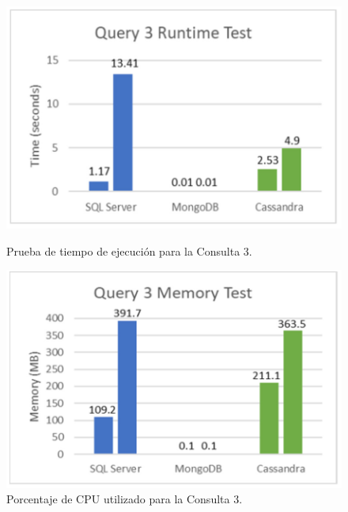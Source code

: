 \documentclass[pdflatex,sn-mathphys-num]{sn-jnl}
\theoremstyle{thmstyleone}%
\theoremstyle{thmstyletwo}%
\theoremstyle{thmstylethree}%
\begin{document}
\begin{figure}[H]
    \centering
    \begin{minipage}[b]{0.48\textwidth}
        \centering
        \includegraphics[width=\textwidth]{figs/cov19-runt-test-q3.png}
        \caption{Prueba de tiempo de ejecución para la Consulta 3.}
        \label{cov19-runtest-q3}
    \end{minipage}
    \hfill
    \begin{minipage}[b]{0.48\textwidth}
        \centering
        \includegraphics[width=\textwidth]{figs/cov19-mem-test-q3.png}
        \caption{Porcentaje de CPU utilizado para la Consulta 3.}
        \label{cov19-memtest-q3}
    \end{minipage}
\end{figure}

\vspace{-0.8cm}
\end{document}
